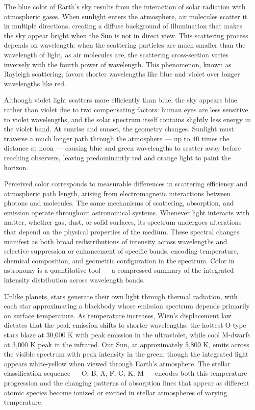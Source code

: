 The blue color of Earth's sky results from the interaction of solar radiation with atmospheric gases. When sunlight enters the atmosphere, air molecules scatter it in multiple directions, creating a diffuse background of illumination that makes the sky appear bright when the Sun is not in direct view. This scattering process depends on wavelength: when the scattering particles are much smaller than the wavelength of light, as air molecules are, the scattering cross-section varies inversely with the fourth power of wavelength. This phenomenon, known as Rayleigh scattering, favors shorter wavelengths like blue and violet over longer wavelengths like red.

Although violet light scatters more efficiently than blue, the sky appears blue rather than violet due to two compensating factors: human eyes are less sensitive to violet wavelengths, and the solar spectrum itself contains slightly less energy in the violet band. At sunrise and sunset, the geometry changes. Sunlight must traverse a much longer path through the atmosphere — up to 40 times the distance at noon — causing blue and green wavelengths to scatter away before reaching observers, leaving predominantly red and orange light to paint the horizon.

Perceived color corresponds to measurable differences in scattering efficiency and atmospheric path length, arising from electromagnetic interactions between photons and molecules. The same mechanisms of scattering, absorption, and emission operate throughout astronomical systems. Whenever light interacts with matter, whether gas, dust, or solid surfaces, its spectrum undergoes alterations that depend on the physical properties of the medium. These spectral changes manifest as both broad redistributions of intensity across wavelengths and selective suppression or enhancement of specific bands, encoding temperature, chemical composition, and geometric configuration in the spectrum. Color in astronomy is a quantitative tool — a compressed summary of the integrated intensity distribution across wavelength bands.

Unlike planets, stars generate their own light through thermal radiation, with each star approximating a blackbody whose emission spectrum depends primarily on surface temperature. As temperature increases, Wien's displacement law dictates that the peak emission shifts to shorter wavelengths: the hottest O-type stars blaze at 30,000 K with peak emission in the ultraviolet, while cool M-dwarfs at 3,000 K peak in the infrared. Our Sun, at approximately 5,800 K, emits across the visible spectrum with peak intensity in the green, though the integrated light appears white-yellow when viewed through Earth's atmosphere. The stellar classification sequence — O, B, A, F, G, K, M — encodes both this temperature progression and the changing patterns of absorption lines that appear as different atomic species become ionized or excited in stellar atmospheres of varying temperature.

